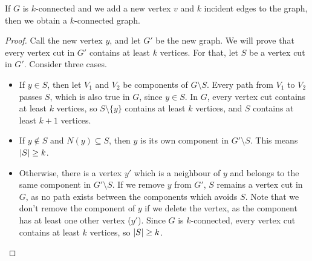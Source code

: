 \begin{theorem}
  If $G$ is $k$-connected and we add a new vertex $v$ and $k$ incident edges to
  the graph, then we obtain a $k$-connected graph.
\end{theorem}

\begin{proof}
  Call the new vertex $y$, and let $G'$ be the new graph.
  We will prove that every vertex cut in $G'$ contains at least $k$ vertices.
  For that, let $S$ be a vertex cut in $G'$.
  Consider three cases.
  \begin{itemize}
  \item If $y \in S$, then let $V_1$ and $V_2$ be components of $G \setminus S$.
	Every path from $V_1$ to $V_2$ passes $S$, which is also true in $G$, since
	$y \in S$.
	In $G$, every vertex cut contains at least $k$ vertices, so $S \setminus
	\{y\}$ contains at least $k$ vertices, and $S$ contains at least $k+1$
	vertices.

  \item If $y \notin S$ and $N(y) \subseteq S$, then $y$ is its own component in
	$G' \setminus S$.
	This means $\left| S \right| \ge k$.

  \item Otherwise, there is a vertex $y'$ which is a neighbour of $y$ and
	belongs to the same component in $G' \setminus S$.
	If we remove $y$ from $G'$, $S$ remains a vertex cut in $G$, as no path
	exists between the components which avoids $S$.
	Note that we don't remove the component of $y$ if we delete the vertex, as
	the component has at least one other vertex ($y'$).
	Since $G$ is $k$-connected, every vertex cut contains at least $k$ vertices,
	so $\left| S \right| \ge k$.
  \end{itemize}
\end{proof}

